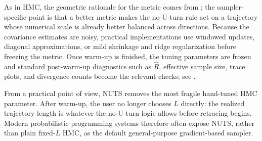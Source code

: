 As in HMC, the geometric rationale for the metric comes from ; the sampler-specific point is that a better metric makes the no-U-turn rule act on a trajectory whose numerical scale is already better balanced across directions.
Because the covariance estimates are noisy, practical implementations use windowed updates, diagonal approximations, or mild shrinkage and ridge regularization before freezing the metric.
Once warm-up is finished, the tuning parameters are frozen and standard post-warm-up diagnostics such as $\hat R$, effective sample size, trace plots, and divergence counts become the relevant checks; see .

From a practical point of view, NUTS removes the most fragile hand-tuned HMC parameter.
After warm-up, the user no longer chooses $L$ directly: the realized trajectory length is whatever the no-U-turn logic allows before retracing begins.
Modern probabilistic programming systems therefore often expose NUTS, rather than plain fixed-$L$ HMC, as the default general-purpose gradient-based sampler.
